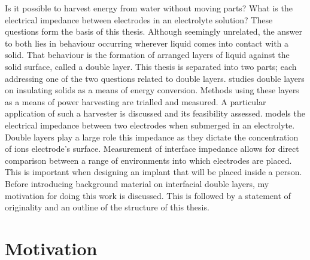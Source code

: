 

Is it possible to harvest energy from water without moving parts?
What is the electrical impedance between electrodes in an electrolyte solution?
These questions form the basis of this thesis.
Although seemingly unrelated, the answer to both lies in behaviour occurring wherever liquid comes into contact with a solid.
That behaviour is the formation of arranged layers of liquid against the solid surface, called a double layer.
This thesis is separated into two parts; each addressing one of the two questions related to double layers.
 studies double layers on insulating solids as a means of energy conversion.
Methods using these layers as a means of power harvesting are trialled and measured.
A particular application of such a harvester is discussed and its feasibility assessed.
 models the electrical impedance between two electrodes when submerged in an electrolyte.
Double layers play a large role this impedance as they dictate the concentration of ions electrode's surface.
Measurement of interface impedance allows for direct comparison between a range of environments into which electrodes are placed.
This is important when designing an implant that will be placed inside a person.
Before introducing background material on interfacial double layers, my motivation for doing this work is discussed.
This is followed by a statement of originality and an outline of the structure of this thesis.


\section{Motivation}


